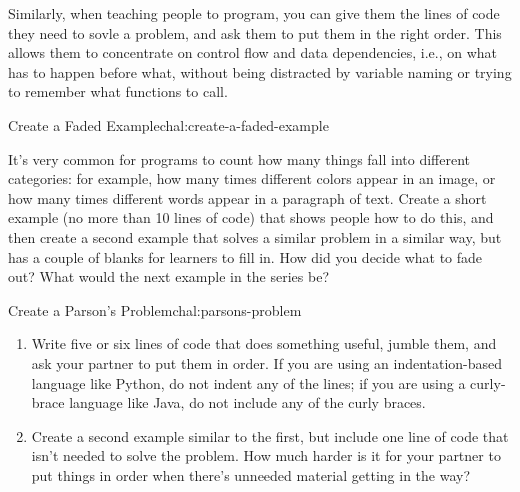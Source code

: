 Similarly, when teaching people to program, you can give them the
lines of code they need to sovle a problem, and ask them to put them
in the right order.  This allows them to concentrate on control flow
and data dependencies, i.e., on what has to happen before what,
without being distracted by variable naming or trying to remember what
functions to call.

\begin{challenge}{Create a Faded Example}{chal:create-a-faded-example}

It's very common for programs to count how many things fall into
different categories: for example, how many times different colors
appear in an image, or how many times different words appear in a
paragraph of text.  Create a short example (no more than 10 lines of
code) that shows people how to do this, and then create a second
example that solves a similar problem in a similar way, but has a
couple of blanks for learners to fill in.  How did you decide what to
fade out?  What would the next example in the series be?

\end{challenge}

\begin{challenge}{Create a Parson's Problem}{chal:parsons-problem}

\begin{enumerate}

\item
  Write five or six lines of code that does something useful, jumble
  them, and ask your partner to put them in order.  If you are using
  an indentation-based language like Python, do not indent any of the
  lines; if you are using a curly-brace language like Java, do not
  include any of the curly braces.

\item
  Create a second example similar to the first, but include one line
  of code that isn't needed to solve the problem.  How much harder is
  it for your partner to put things in order when there's unneeded
  material getting in the way?

\end{enumerate}

\end{challenge}
